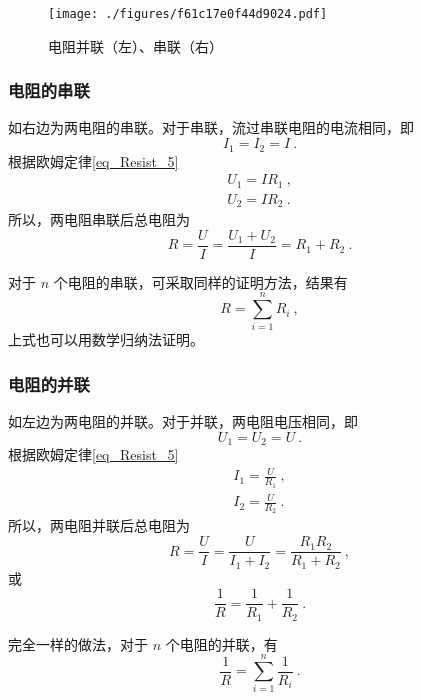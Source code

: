 
\begin{figure}[ht]
\centering
\texttt{[image: ./figures/f61c17e0f44d9024.pdf]}
\caption{电阻并联（左）、串联（右）} \label{fig_Rcomb_1}
\end{figure}
\subsubsection{电阻的串联}
如右边为两电阻的串联。对于串联，流过串联电阻的电流相同，即
\begin{equation}
I_1=I_2=I~.
\end{equation}
根据欧姆定律\autoref{eq_Resist_5}~
\begin{equation}
\begin{aligned}
U_1=IR_1~,\\
U_2=IR_2~.
\end{aligned}
\end{equation}
所以，两电阻串联后总电阻为
\begin{equation}
R = \frac{U}{I}=\frac{U_1+U_2}{I} = {R_1 + R_2}~.
\end{equation}

对于 $n$ 个电阻的串联，可采取同样的证明方法，结果有
\begin{equation}\label{eq_Rcomb_1}
R=\sum_{i=1}^{n}R_i~,
\end{equation}
上式也可以用数学归纳法证明。
\subsubsection{电阻的并联}
如左边为两电阻的并联。对于并联，两电阻电压相同，即
\begin{equation}
U_1=U_2=U~.
\end{equation}
根据欧姆定律\autoref{eq_Resist_5}~
\begin{equation}
\begin{aligned}
I_1=\frac{U}{R_1}~,\\
I_2=\frac{U}{R_2}~.
\end{aligned}
\end{equation}
所以，两电阻并联后总电阻为
\begin{equation}
R = \frac{U}{I}=\frac{U}{I_1+I_2} =\frac{R_1R_2} {R_1 + R_2}~,
\end{equation}
或
\begin{equation}
\frac{1}{R} = \frac{1} {R_1}+\frac{1}{R_2}~.
\end{equation}

完全一样的做法，对于 $n$ 个电阻的并联，有
\begin{equation}\label{eq_Rcomb_2}
\frac{1}{R}=\sum_{i=1}^{n}\frac{1}{R_i}~.
\end{equation}
